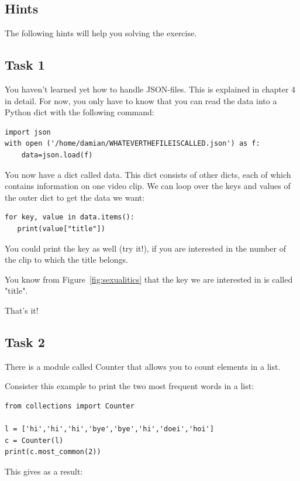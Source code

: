 \documentclass[a4paper,12pt]{book}
\begin{document}
\begin{appendices}
\section{Hints}
The following hints will help you solving the exercise.

\subsection*{Task 1}

You haven't learned yet how to handle JSON-files. This is explained in chapter 4 in detail. For now, you only have to know that you can read the data into a Python dict with the following command:

\begin{lstlisting}
import json
with open ('/home/damian/WHATEVERTHEFILEISCALLED.json') as f:
    data=json.load(f)
\end{lstlisting}

You now have a dict called data. This dict consists of other dicts, each of which contains information on one video clip. We can loop over the keys and values of the outer dict to get the data we want:

\begin{lstlisting}
for key, value in data.items():
   print(value["title"])
\end{lstlisting}

You could print the key as well (try it!), if you are interested in the number of the clip to which the title belongs.

You know from Figure~\ref{fig:sexualitics} that the key we are interested in is called "title".

That's it!


\subsection*{Task 2}

There is a module called Counter that allows you to count elements in a list.

Consister this example to print the two most frequent words in a list:

\begin{lstlisting}
from collections import Counter

l = ['hi','hi','hi','bye','bye','hi','doei','hoi']
c = Counter(l)
print(c.most_common(2))
\end{lstlisting}

This gives as a result: 


\end{appendices}
\end{document}
